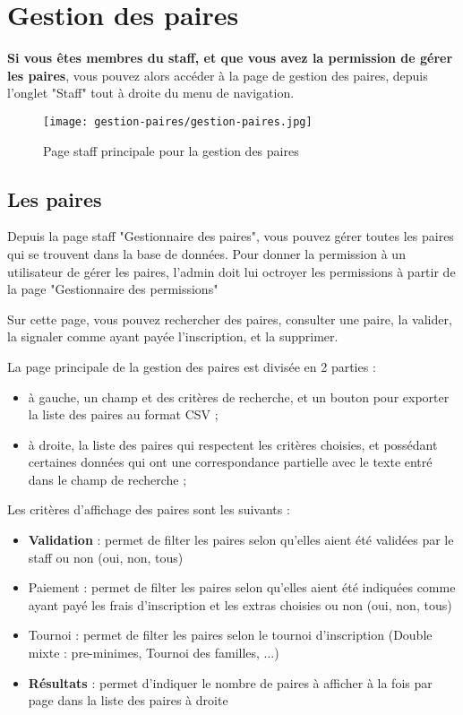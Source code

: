\section{Gestion des paires}

\textbf{Si vous êtes membres du staff, et que vous avez la permission de gérer les paires}, vous pouvez alors accéder à la page de gestion des paires, depuis l'onglet "Staff" tout à droite du menu de navigation.

\begin{figure}[H]
\centering
\texttt{[image: gestion-paires/gestion-paires.jpg]}
\caption{Page staff principale pour la gestion des paires}
\end{figure}

\subsection{Les paires}

Depuis la page staff "Gestionnaire des paires", vous pouvez gérer toutes les paires qui se trouvent dans la base de données. Pour donner la permission à un utilisateur de gérer les paires, l'admin doit lui octroyer les permissions à partir de la page "Gestionnaire des permissions"

\bigskip

Sur cette page, vous pouvez rechercher des paires, consulter une paire, la valider, la signaler comme ayant payée l'inscription, et la supprimer.\newline

La page principale de la gestion des paires est divisée en 2 parties :

\begin{itemize}
\item  à gauche, un champ et des critères de recherche, et un bouton pour exporter la liste des paires au format CSV ;
\item à droite, la liste des paires qui respectent les critères choisies, et possédant certaines données qui ont une correspondance partielle avec le texte entré dans le champ de recherche ;
\end{itemize}
\bigskip

Les critères d'affichage des paires sont les suivants :

\begin{itemize}
\item \textbf{Validation} : permet de filter les paires selon qu'elles aient été validées par le staff ou non (oui, non, tous)
\item Paiement : permet de filter les paires selon qu'elles aient été indiquées comme ayant payé les frais d'inscription et les extras choisies ou non (oui, non, tous)
\item Tournoi : permet de filter les paires selon le tournoi d'inscription (Double mixte : pre-minimes, Tournoi des familles, ...)
\item \textbf{Résultats} : permet d'indiquer le nombre de paires à afficher à la fois par page dans la liste des paires à droite
\end{itemize}
\bigskip

